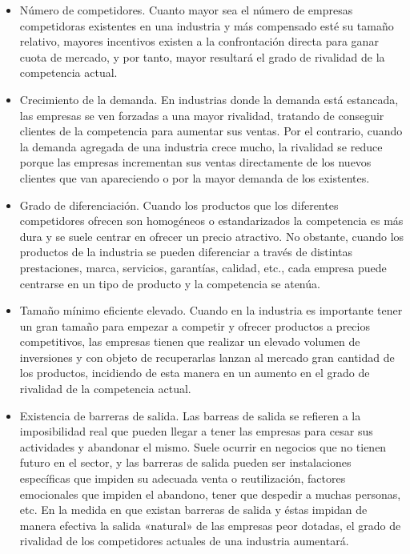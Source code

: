 \documentclass[
]{krantz}
\providecommand{\tightlist}{%
  \setlength{\itemsep}{0pt}\setlength{\parskip}{0pt}}
\begin{document}
\begin{itemize}
\tightlist
\item
  Número de competidores. Cuanto mayor sea el número de empresas competidoras existentes en una industria y más compensado esté su tamaño relativo, mayores incentivos existen a la confrontación directa para ganar cuota de mercado, y por tanto, mayor resultará el grado de rivalidad de la competencia actual.
\item
  Crecimiento de la demanda. En industrias donde la demanda está estancada, las empresas se ven forzadas a una mayor rivalidad, tratando de conseguir clientes de la competencia para aumentar sus ventas. Por el contrario, cuando la demanda agregada de una industria crece mucho, la rivalidad se reduce porque las empresas incrementan sus ventas directamente de los nuevos clientes que van apareciendo o por la mayor demanda de los existentes.
\item
  Grado de diferenciación. Cuando los productos que los diferentes competidores ofrecen son homogéneos o estandarizados la competencia es más dura y se suele centrar en ofrecer un precio atractivo. No obstante, cuando los productos de la industria se pueden diferenciar a través de distintas prestaciones, marca, servicios, garantías, calidad, etc., cada empresa puede centrarse en un tipo de producto y la competencia se atenúa.
\item
  Tamaño mínimo eficiente elevado. Cuando en la industria es importante tener un gran tamaño para empezar a competir y ofrecer productos a precios competitivos, las empresas tienen que realizar un elevado volumen de inversiones y con objeto de recuperarlas lanzan al mercado gran cantidad de los productos, incidiendo de esta manera en un aumento en el grado de rivalidad de la competencia actual.
\item
  Existencia de barreras de salida. Las barreas de salida se refieren a la imposibilidad real que pueden llegar a tener las empresas para cesar sus actividades y abandonar el mismo. Suele ocurrir en negocios que no tienen futuro en el sector, y las barreras de salida pueden ser instalaciones específicas que impiden su adecuada venta o reutilización, factores emocionales que impiden el abandono, tener que despedir a muchas personas, etc. En la medida en que existan barreras de salida y éstas impidan de manera efectiva la salida «natural» de las empresas peor dotadas, el grado de rivalidad de los competidores actuales de una industria aumentará.
\end{itemize}
\end{document}
